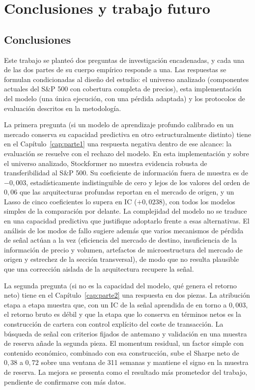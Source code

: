 \chapter{Conclusiones y trabajo futuro}\label{cap:conclusiones}

\section{Conclusiones}

Este trabajo se planteó dos preguntas de investigación encadenadas, y cada una de las dos
partes de su cuerpo empírico responde a una. Las respuestas se formulan condicionadas al
diseño del estudio: el universo analizado (componentes actuales del S\&P 500 con cobertura
completa de precios), esta implementación del modelo (una única ejecución, con una pérdida
adaptada) y los protocolos de evaluación descritos en la metodología.

La primera pregunta (si un modelo de aprendizaje profundo calibrado en un mercado conserva
su capacidad predictiva en otro estructuralmente distinto) tiene en el
Capítulo~\ref{cap:parte1} una respuesta negativa dentro de ese alcance: la evaluación se
resuelve con el rechazo del modelo. En esta
implementación y sobre el universo analizado, Stockformer no muestra evidencia robusta de
transferibilidad al S\&P 500. Su coeficiente de información fuera de muestra es de
$-0{,}003$, estadísticamente indistinguible de cero y lejos de los valores del orden de
$0{,}06$ que las arquitecturas profundas reportan en el mercado de origen, y un Lasso de
cinco coeficientes lo supera en IC ($+0{,}0238$), con todos los modelos simples de la
comparación por delante. La complejidad del modelo no se traduce en una capacidad
predictiva que justifique adoptarlo frente a esas alternativas. El análisis de los modos de fallo
sugiere además que varios
mecanismos de pérdida de señal actúan a la vez (eficiencia del mercado de destino,
insuficiencia de la información de precio y volumen, artefactos de microestructura del
mercado de origen y estrechez de la sección transversal), de modo que no resulta plausible
que una corrección aislada de la arquitectura recupere la señal.

La segunda pregunta (si no es la capacidad del modelo, qué genera el retorno neto) tiene
en el Capítulo~\ref{cap:parte2} una respuesta en dos piezas. La atribución etapa a etapa
muestra que, con un IC de la señal aprendida de en torno a $0{,}003$, el retorno bruto es
débil y que la etapa que lo conserva en términos netos es la construcción de cartera con
control explícito del coste de transacción. La búsqueda de señal con criterios fijados de
antemano y validación en una muestra de reserva añade la segunda pieza. El momentum
residual, un factor simple con contenido económico, combinado con esa construcción, sube
el Sharpe neto de $0{,}38$ a $0{,}72$ sobre una ventana de 311 semanas y mantiene el signo
en la muestra de reserva. La mejora se presenta como el resultado más prometedor del
trabajo, pendiente de confirmarse con más datos.

